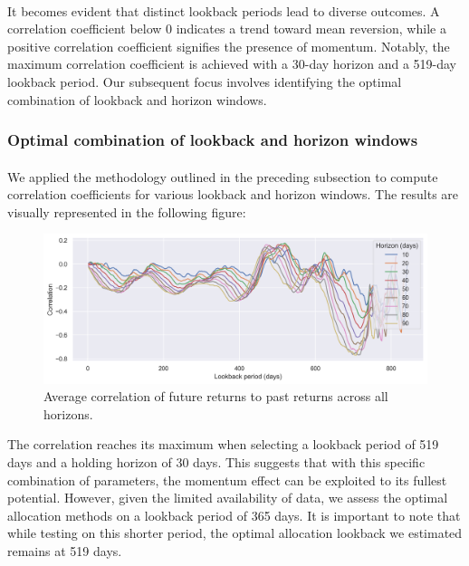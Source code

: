 \documentclass{article}
\begin{document}
\paragraph{}
It becomes evident that distinct lookback periods lead to diverse outcomes. A correlation coefficient below 0 indicates a trend toward mean reversion, while a positive correlation coefficient signifies the presence of momentum. Notably, the maximum correlation coefficient is achieved with a 30-day horizon and a 519-day lookback period. Our subsequent focus involves identifying the optimal combination of lookback and horizon windows.

\subsubsection{Optimal combination of lookback and horizon windows} \label{subsec:opt}
\paragraph{}
We applied the methodology outlined in the preceding subsection to compute correlation coefficients for various lookback and horizon windows. The results are visually represented in the following figure:

\begin{figure}[H] %
    \centering
    \includegraphics[width=1\linewidth]{combinations.png}
    \caption{Average correlation of future returns to past returns across all horizons.}
    \label{fig:fig3}
\end{figure}

The correlation reaches its maximum when selecting a lookback period of 519 days and a holding horizon of 30 days. This suggests that with this specific combination of parameters, the momentum effect can be exploited to its fullest potential. However, given the limited availability of data, we assess the optimal allocation methods on a lookback period of 365 days. It is important to note that while testing on this shorter period, the optimal allocation lookback we estimated remains at 519 days.
\end{document}
